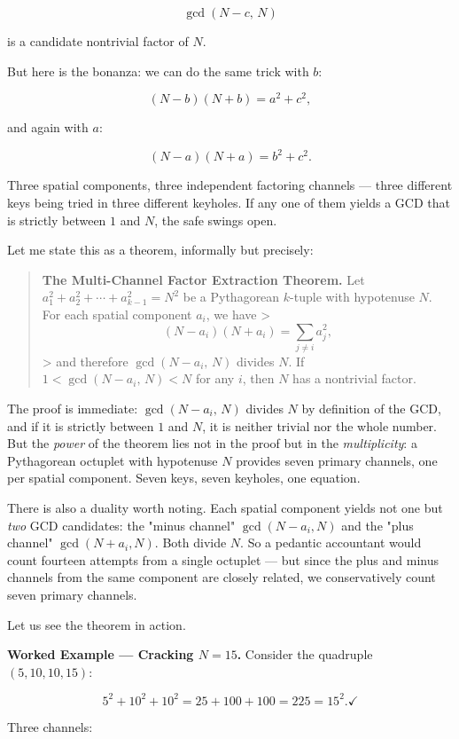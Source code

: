 \[
\gcd(N - c, \, N)
\]

is a candidate nontrivial factor of $N$.

But here is the bonanza: we can do the same trick with $b$:

\[
(N - b)(N + b) = a^2 + c^2,
\]

and again with $a$:

\[
(N - a)(N + a) = b^2 + c^2.
\]

Three spatial components, three independent factoring channels --- three different keys being tried in three different keyholes. If any one of them yields a GCD that is strictly between $1$ and $N$, the safe swings open.

Let me state this as a theorem, informally but precisely:

\begin{quote}
\textbf{The Multi-Channel Factor Extraction Theorem.} Let $a_1^2 + a_2^2 + \cdots + a_{k-1}^2 = N^2$ be a Pythagorean $k$-tuple with hypotenuse $N$. For each spatial component $a_i$, we have
>
$$(N - a_i)(N + a_i) = \sum_{j \ne i} a_j^2,$$
>
and therefore $\gcd(N - a_i, \, N)$ divides $N$. If $1 < \gcd(N - a_i, \, N) < N$ for any $i$, then $N$ has a nontrivial factor.
\end{quote}

The proof is immediate: $\gcd(N - a_i, \, N)$ divides $N$ by definition of the GCD, and if it is strictly between $1$ and $N$, it is neither trivial nor the whole number. But the \textit{power} of the theorem lies not in the proof but in the \textit{multiplicity}: a Pythagorean octuplet with hypotenuse $N$ provides seven primary channels, one per spatial component. Seven keys, seven keyholes, one equation.

There is also a duality worth noting. Each spatial component yields not one but \textit{two} GCD candidates: the "minus channel" $\gcd(N - a_i, N)$ and the "plus channel" $\gcd(N + a_i, N)$. Both divide $N$. So a pedantic accountant would count fourteen attempts from a single octuplet --- but since the plus and minus channels from the same component are closely related, we conservatively count seven primary channels.

Let us see the theorem in action.

\textbf{Worked Example --- Cracking $N = 15$.} Consider the quadruple $(5, 10, 10, 15)$:

\[
5^2 + 10^2 + 10^2 = 25 + 100 + 100 = 225 = 15^2. \checkmark
\]

Three channels:

